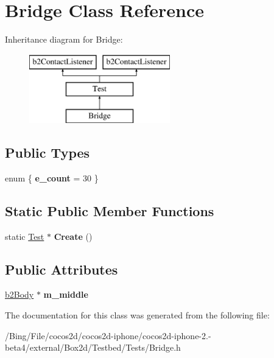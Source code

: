 \hypertarget{class_bridge}{\section{Bridge Class Reference}
\label{class_bridge}
}
Inheritance diagram for Bridge\-:\begin{figure}[H]
\begin{center}
\leavevmode
\includegraphics[height=3.000000cm]{class_bridge}
\end{center}
\end{figure}
\subsection*{Public Types}
\begin{DoxyCompactItemize}
\item 
enum \{ {\bfseries e\-\_\-count} =  30
 \}
\end{DoxyCompactItemize}
\subsection*{Static Public Member Functions}
\begin{DoxyCompactItemize}
\item 
\hypertarget{class_bridge_a31eb64b2d9d33da7d7fad1380dc82559}{static \hyperlink{class_test}{Test} $\ast$ {\bfseries Create} ()}\label{class_bridge_a31eb64b2d9d33da7d7fad1380dc82559}

\end{DoxyCompactItemize}
\subsection*{Public Attributes}
\begin{DoxyCompactItemize}
\item 
\hypertarget{class_bridge_ac0f0fefdf9b5a77a20c9555f74f2da8a}{\hyperlink{classb2_body}{b2\-Body} $\ast$ {\bfseries m\-\_\-middle}}\label{class_bridge_ac0f0fefdf9b5a77a20c9555f74f2da8a}

\end{DoxyCompactItemize}


The documentation for this class was generated from the following file\-:\begin{DoxyCompactItemize}
\item 
/\-Bing/\-File/cocos2d/cocos2d-\/iphone/cocos2d-\/iphone-\/2.-\/beta4/external/\-Box2d/\-Testbed/\-Tests/Bridge.\-h\end{DoxyCompactItemize}

